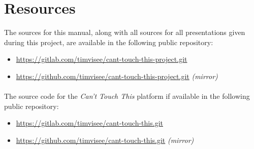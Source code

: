 \documentclass{standalone}
\begin{document}
  \section{Resources}
  The sources for this manual, along with all sources for all presentations
  given during this project, are available in the following public repository:

  \begin{itemize}
    \tightlist{}
    \item \url{https://gitlab.com/timvisee/cant-touch-this-project.git}
    \item \url{https://github.com/timvisee/cant-touch-this-project.git} \emph{(mirror)}
  \end{itemize}

  \paragraph{}
  The source code for the \emph{Can't Touch This} platform if available in the
  following public repository:

  \begin{itemize}
    \tightlist{}
    \item \url{https://gitlab.com/timvisee/cant-touch-this.git}
    \item \url{https://github.com/timvisee/cant-touch-this.git} \emph{(mirror)}
  \end{itemize}
\end{document}
